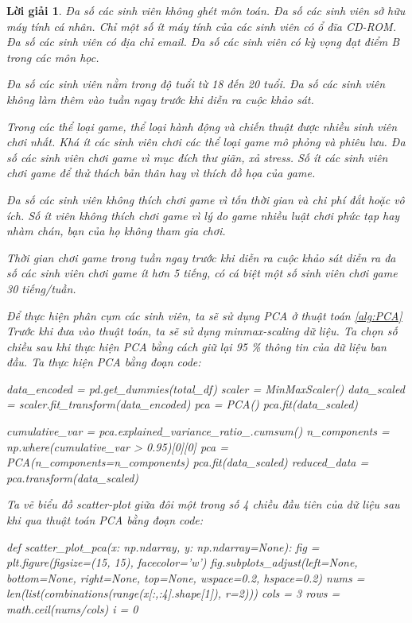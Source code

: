 \documentclass[14pt, a4paper]{article}
\theoremstyle{sltheorem}
\theoremstyle{soltheorem}
\newtheorem*{loigiai}{Lời giải}
\begin{document}
\begin{loigiai}
    Đa số các sinh viên không ghét môn toán.
    Đa số các sinh viên sở hữu máy tính cá nhân.
    Chỉ một số ít máy tính của các sinh viên có ổ đĩa CD-ROM.
    Đa số các sinh viên có địa chỉ email.
    Đa số các sinh viên có kỳ vọng đạt điểm B trong các môn học.

    Đa số các sinh viên nằm trong độ tuổi từ 18 đến 20 tuổi.
    Đa số các sinh viên không làm thêm vào tuần ngay trước khi diễn ra cuộc khảo sát.

    Trong các thể loại game, thể loại hành động và chiến thuật được nhiều sinh viên chơi nhất.
    Khá ít các sinh viên chơi các thể loại game mô phỏng và phiêu lưu.
    Đa số các sinh viên chơi game vì mục đích thư giãn, xả stress.
    Số ít các sinh viên chơi game để thử thách bản thân hay vì thích đồ họa của game.

    Đa số các sinh viên không thích chơi game vì tốn thời gian và chi phí đắt hoặc vô ích.
    Số ít viên không thích chơi game vì lý do game nhiều luật chơi phức tạp hay nhàm chán, bạn của họ không tham gia chơi.

    Thời gian chơi game trong tuần ngay trước khi diễn ra cuộc khảo sát diễn ra đa số các sinh viên chơi game ít hơn 5 tiếng, có cá biệt một số sinh viên chơi game 30 tiếng/tuần.

    Để thực hiện phân cụm các sinh viên, ta sẽ sử dụng PCA ở thuật toán \ref{alg:PCA}
    Trước khi đưa vào thuật toán, ta sẽ sử dụng minmax-scaling dữ liệu.
    Ta chọn số chiều sau khi thực hiện PCA bằng cách giữ lại 95 \% thông tin của dữ liệu ban đầu.
    Ta thực hiện PCA bằng đoạn code:

    \begin{python}
data_encoded = pd.get_dummies(total_df)
scaler = MinMaxScaler()
data_scaled = scaler.fit_transform(data_encoded)
pca = PCA()
pca.fit(data_scaled)

cumulative_var = pca.explained_variance_ratio_.cumsum()
n_components = np.where(cumulative_var > 0.95)[0][0]
pca = PCA(n_components=n_components)
pca.fit(data_scaled)
reduced_data = pca.transform(data_scaled)
    \end{python}

    Ta vẽ biểu đồ scatter-plot giữa đôi một trong số 4 chiều đầu tiên của dữ liệu sau khi qua thuật toán PCA bằng đoạn code:

    \begin{python}
def scatter_plot_pca(x: np.ndarray, y: np.ndarray=None):
    fig = plt.figure(figsize=(15, 15), facecolor='w')
    fig.subplots_adjust(left=None, bottom=None, right=None, top=None, wspace=0.2, hspace=0.2)
    nums = len(list(combinations(range(x[:,:4].shape[1]), r=2)))
    cols = 3
    rows = math.ceil(nums/cols)
    i = 0
    

\end{python}
\end{loigiai}
\end{document}
